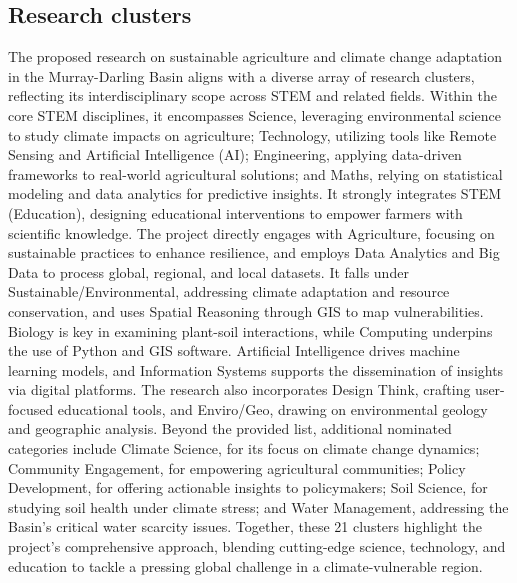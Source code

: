 
\subsection{Research clusters}
The proposed research on sustainable agriculture and climate change adaptation in the Murray-Darling Basin aligns with a diverse array of research clusters, reflecting its interdisciplinary scope across STEM and related fields. Within the core STEM disciplines, it encompasses Science, leveraging environmental science to study climate impacts on agriculture; Technology, utilizing tools like Remote Sensing and Artificial Intelligence (AI); Engineering, applying data-driven frameworks to real-world agricultural solutions; and Maths, relying on statistical modeling and data analytics for predictive insights. It strongly integrates STEM (Education), designing educational interventions to empower farmers with scientific knowledge. The project directly engages with Agriculture, focusing on sustainable practices to enhance resilience, and employs Data Analytics and Big Data to process global, regional, and local datasets. It falls under Sustainable/Environmental, addressing climate adaptation and resource conservation, and uses Spatial Reasoning through GIS to map vulnerabilities. Biology is key in examining plant-soil interactions, while Computing underpins the use of Python and GIS software. Artificial Intelligence drives machine learning models, and Information Systems supports the dissemination of insights via digital platforms. The research also incorporates Design Think, crafting user-focused educational tools, and Enviro/Geo, drawing on environmental geology and geographic analysis. Beyond the provided list, additional nominated categories include Climate Science, for its focus on climate change dynamics; Community Engagement, for empowering agricultural communities; Policy Development, for offering actionable insights to policymakers; Soil Science, for studying soil health under climate stress; and Water Management, addressing the Basin’s critical water scarcity issues. Together, these 21 clusters highlight the project’s comprehensive approach, blending cutting-edge science, technology, and education to tackle a pressing global challenge in a climate-vulnerable region.




